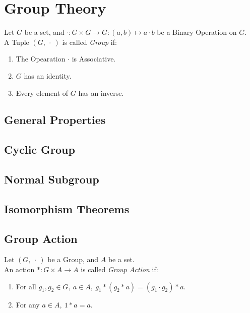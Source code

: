 \chapter{Group Theory}
\begin{definition}
    Let $G$ be a set, and $\cdot:G \times G \to G:(a,b) \mapsto a \cdot b$ be a Binary Operation on $G$. \\
    A Tuple $(G, \ \cdot\ )$ is called \textit{Group} if: 
    \begin{enumerate}
        \item The Opearation $\cdot$ is Associative.
        \item $G$ has an identity.
        \item Every element of $G$ has an inverse.
    \end{enumerate}
\end{definition}
\section{General Properties}

\section{Cyclic Group}

\section{Normal Subgroup}

\section{Isomorphism Theorems}

\section{Group Action}
\begin{definition}
    Let $(G, \ \cdot \ )$ be a Group, and $A$ be a set. \\
    An action $\ast:G \times A \to A$ is called \textit{Group Action} if:
    \begin{enumerate}
        \item For all $g_1, g_2 \in G,\ a \in A,\ g_1 \ast(g_2 \ast a) = (g_1 \cdot g_2) \ast a$.
        \item For any $a \in A,\ 1 \ast a = a$.
    \end{enumerate}
\end{definition}
